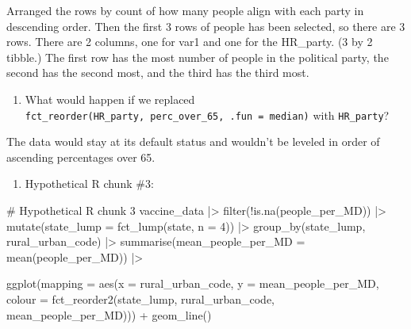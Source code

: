 \documentclass[
  letterpaper,
  DIV=11,
  numbers=noendperiod]{scrartcl}
\newenvironment{Shaded}{\begin{snugshade}}{\end{snugshade}}
\newcommand{\AttributeTok}[1]{\textcolor[rgb]{0.40,0.45,0.13}{#1}}
\newcommand{\CommentTok}[1]{\textcolor[rgb]{0.37,0.37,0.37}{#1}}
\newcommand{\DecValTok}[1]{\textcolor[rgb]{0.68,0.00,0.00}{#1}}
\newcommand{\FunctionTok}[1]{\textcolor[rgb]{0.28,0.35,0.67}{#1}}
\newcommand{\NormalTok}[1]{\textcolor[rgb]{0.00,0.23,0.31}{#1}}
\newcommand{\SpecialCharTok}[1]{\textcolor[rgb]{0.37,0.37,0.37}{#1}}
\providecommand{\tightlist}{%
  \setlength{\itemsep}{0pt}\setlength{\parskip}{0pt}}
\begin{document}
Arranged the rows by count of how many people align with each party in
descending order. Then the first 3 rows of people has been selected, so
there are 3 rows. There are 2 columns, one for var1 and one for the
HR\_party. (3 by 2 tibble.) The first row has the most number of people
in the political party, the second has the second most, and the third
has the third most.

\begin{enumerate}
\def\labelenumi{\alph{enumi})}
\setcounter{enumi}{2}
\tightlist
\item
  What would happen if we replaced
  \texttt{fct\_reorder(HR\_party,\ perc\_over\_65,\ .fun\ =\ median)}
  with \texttt{HR\_party}?
\end{enumerate}

The data would stay at its default status and wouldn't be leveled in
order of ascending percentages over 65.

\begin{enumerate}
\def\labelenumi{\arabic{enumi}.}
\setcounter{enumi}{9}
\tightlist
\item
  Hypothetical R chunk \#3:
\end{enumerate}

\begin{Shaded}
\begin{Highlighting}[]
\CommentTok{\# Hypothetical R chunk 3}
\NormalTok{vaccine\_data }\SpecialCharTok{|\textgreater{}}
  \FunctionTok{filter}\NormalTok{(}\SpecialCharTok{!}\FunctionTok{is.na}\NormalTok{(people\_per\_MD)) }\SpecialCharTok{|\textgreater{}}
  \FunctionTok{mutate}\NormalTok{(}\AttributeTok{state\_lump =} \FunctionTok{fct\_lump}\NormalTok{(state, }\AttributeTok{n =} \DecValTok{4}\NormalTok{)) }\SpecialCharTok{|\textgreater{}}
  \FunctionTok{group\_by}\NormalTok{(state\_lump, rural\_urban\_code) }\SpecialCharTok{|\textgreater{}}
  \FunctionTok{summarise}\NormalTok{(}\AttributeTok{mean\_people\_per\_MD =} \FunctionTok{mean}\NormalTok{(people\_per\_MD)) }\SpecialCharTok{|\textgreater{}}
  
  \FunctionTok{ggplot}\NormalTok{(}\AttributeTok{mapping =} \FunctionTok{aes}\NormalTok{(}\AttributeTok{x =}\NormalTok{ rural\_urban\_code, }\AttributeTok{y =}\NormalTok{ mean\_people\_per\_MD, }
      \AttributeTok{colour =} \FunctionTok{fct\_reorder2}\NormalTok{(state\_lump, rural\_urban\_code, mean\_people\_per\_MD))) }\SpecialCharTok{+}
    \FunctionTok{geom\_line}\NormalTok{()}
\end{Highlighting}
\end{Shaded}
\end{document}
